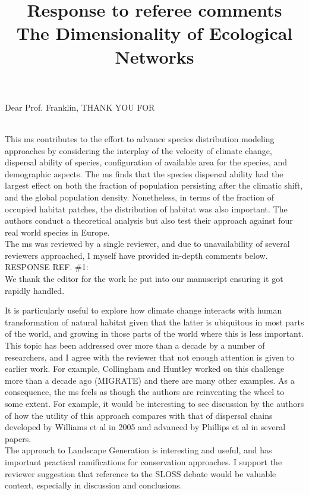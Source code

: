 \documentclass[12pt,pdftex]{article}
\date{}
\title{Response to referee comments\\The Dimensionality of Ecological Networks}
\begin{document}
\linenumbers
\maketitle
\baselineskip 18pt

\noindent Dear Prof. Franklin,
THANK YOU FOR 

\\
This ms contributes to the effort to advance species distribution modeling approaches by considering the interplay of the velocity of climate change, dispersal ability of species, configuration of available area for the species, and demographic aspects. The ms finds that the species dispersal ability had the largest effect on both the fraction of population persisting after the climatic shift, and the global population density. Nonetheless, in terms of the fraction of occupied habitat patches, the distribution of habitat was also important. The authors conduct a theoretical analysis but also test their approach against 
four real world species in Europe. \\

The ms was reviewed by a single reviewer, and due to unavailability of several reviewers approached, I myself have provided in-depth comments below.\\

\noindent RESPONSE REF. \#1:\\
We thank the editor for the work he put into our manuscript ensuring it got rapidly handled. 

It is particularly useful to explore how climate change interacts with human transformation of natural habitat given that the latter is ubiquitous in most parts of the world, and growing in those parts of the world where this is less important. This topic has been addressed over more than a decade by a number of researchers, and I agree with the reviewer that not enough attention is given to earlier work. For example, Collingham and Huntley worked on this challenge more than a decade ago (MIGRATE) and there are many other examples. As a consequence, the ms feels as though the authors are reinventing the wheel to some extent. For example, it would be interesting to see discussion by the authors of how the utility of this approach compares with that of dispersal chains developed by Williams et al in 2005 and advanced by Phillips et al in several papers.\\

The approach to Landscape Generation is interesting and useful, and has important practical ramifications for conservation approaches. I support the reviewer suggestion that reference to the SLOSS debate would be valuable context, especially in discussion and conclusions.\\
\end{document}
